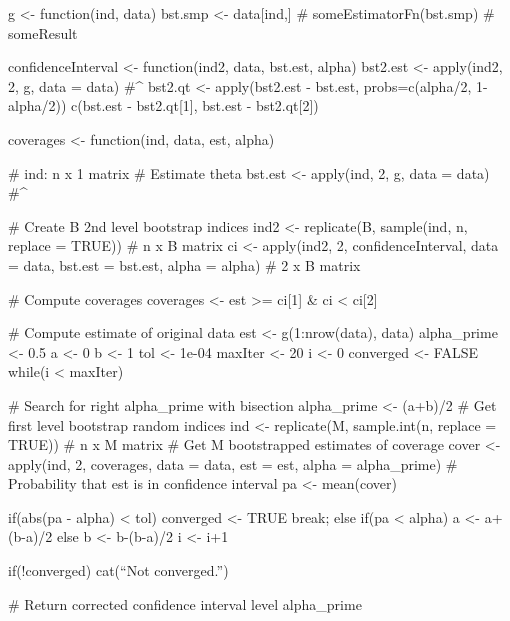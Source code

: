  \begin{code}
  g <- function(ind, data){
    bst.smp <- data[ind,]
    # someEstimatorFn(bst.smp)
    # someResult
  }
 
  confidenceInterval <- function(ind2, data, bst.est, alpha){
    bst2.est <- apply(ind2, 2, g, data = data) #\hat{\theta}^{\ast\ast}
    bst2.qt <- apply(bst2.est - bst.est, probs=c(alpha/2, 1-alpha/2))
    c(bst.est - bst2.qt[1], bst.est - bst2.qt[2])
  }
 
  coverages <- function(ind, data, est, alpha){ # ind: n x 1 matrix
    # Estimate theta
    bst.est <- apply(ind, 2, g, data = data) #\hat{\theta}^{\ast}
    
    # Create B 2nd level bootstrap indices
    ind2 <- replicate(B, sample(ind, n, replace = TRUE)) # n x B matrix
    ci <- apply(ind2, 2, confidenceInterval, data = data, bst.est = bst.est, alpha = alpha) # 2 x B matrix
    
    # Compute coverages
    coverages <- est >= ci[1] & ci < ci[2]
  }
 
  # Compute estimate of original data
  est <- g(1:nrow(data), data)
  alpha_prime <- 0.5
  a <- 0
  b <- 1
  tol <- 1e-04
  maxIter <- 20
  i <- 0
  converged <- FALSE
  while(i < maxIter){ # Search for right alpha_prime with bisection
    alpha_prime <- (a+b)/2
    # Get first level bootstrap random indices
    ind <- replicate(M, sample.int(n, replace = TRUE)) # n x M matrix
    # Get M bootstrapped estimates of coverage
    cover <- apply(ind, 2, coverages, data = data, est = est, alpha = alpha_prime)
    # Probability that est is in confidence interval
    pa <- mean(cover)
    
    if(abs(pa - alpha) < tol){
        converged <- TRUE
        break;
    }
    else{
        if(pa < alpha){
            a <- a+(b-a)/2
        }
        else{
            b <- b-(b-a)/2
        }
    }
    i <- i+1
  }
  
  if(!converged){
    cat(``Not converged.'')
  }
  
  # Return corrected confidence interval level
  alpha_prime
 \end{code}

